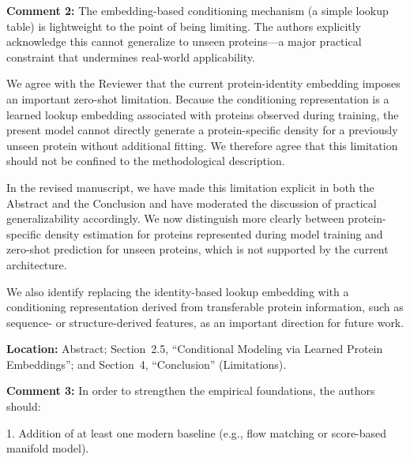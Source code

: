 \documentclass[a4paper,11pt]{article}
\newcommand{\reviewercomment}[2]{%
    \begin{reviewerscomment}
        \textbf{Comment #1:} #2
    \end{reviewerscomment}
}
\newcommand{\response}[1]{%
    \begin{myresponse}
        #1
    \end{myresponse}
    \vspace{5mm}
}
\begin{document}

\reviewercomment{2}{
The embedding-based conditioning mechanism (a simple lookup table) is
lightweight to the point of being limiting. The authors explicitly acknowledge
this cannot generalize to unseen proteins---a major practical constraint that
undermines real-world applicability.
}

\response{
We agree with the Reviewer that the current protein-identity embedding imposes
an important zero-shot limitation. Because the conditioning representation is
a learned lookup embedding associated with proteins observed during training,
the present model cannot directly generate a protein-specific density for a
previously unseen protein without additional fitting. We therefore agree that
this limitation should not be confined to the methodological description.

In the revised manuscript, we have made this limitation explicit in both the
Abstract and the Conclusion and have moderated the discussion of practical
generalizability accordingly. We now distinguish more clearly between
protein-specific density estimation for proteins represented during model
training and zero-shot prediction for unseen proteins, which is not supported
by the current architecture.

We also identify replacing the identity-based lookup embedding with a
conditioning representation derived from transferable protein information,
such as sequence- or structure-derived features, as an important direction for
future work.

\textbf{Location:} Abstract; Section~2.5, ``Conditional Modeling via Learned
Protein Embeddings''; and Section~4, ``Conclusion'' (Limitations).
}



\reviewercomment{3}{
In order to strengthen the empirical foundations, the authors should:

1. Addition of at least one modern baseline (e.g., flow matching or
score-based manifold model).
}
\end{document}
